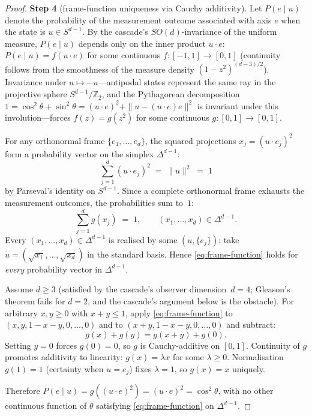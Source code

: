 \documentclass[12pt,a4paper]{article}
\begin{document}
\begin{proof}
\textbf{Step 4} (frame-function uniqueness via Cauchy additivity).
Let $P(e\mid u)$ denote the probability of the measurement outcome
associated with axis $e$ when the state is $u\in S^{d-1}$. By the
cascade's $SO(d)$-invariance of the uniform measure, $P(e\mid u)$
depends only on the inner product $u\cdot e$:
$P(e\mid u) = f(u\cdot e)$ for some continuous $f:[-1,1]\to[0,1]$
(continuity follows from the smoothness of the measure density
$(1-z^2)^{(d-3)/2}$). Invariance under $u\mapsto -u$---antipodal states
represent the same ray in the projective sphere $S^{d-1}/\mathbb{Z}_2$, and
the Pythagorean decomposition~$1 = \cos^2\theta + \sin^2\theta
= (u\cdot e)^2 + \|u-(u\cdot e)e\|^2$ is invariant under this
involution---forces $f(z) = g(z^2)$ for some continuous
$g:[0,1]\to[0,1]$.

For any orthonormal frame $\{e_1,\ldots,e_d\}$, the squared projections
$x_j = (u\cdot e_j)^2$ form a probability vector on the simplex $\Delta^{d-1}$:
\[
\sum_{j=1}^{d}(u\cdot e_j)^2 \;=\; \|u\|^2 \;=\; 1
\]
by Parseval's identity on $S^{d-1}$. Since a complete orthonormal frame
exhausts the measurement outcomes, the probabilities sum to~$1$:
\begin{equation}\label{eq:frame-function}
\sum_{j=1}^{d} g(x_j) \;=\; 1, \qquad (x_1,\ldots,x_d)\in\Delta^{d-1}.
\end{equation}
Every $(x_1,\ldots,x_d)\in\Delta^{d-1}$ is realised by some $(u,\{e_j\})$:
take $u = (\sqrt{x_1},\ldots,\sqrt{x_d})$ in the standard basis. Hence
\eqref{eq:frame-function} holds for \emph{every} probability vector in
$\Delta^{d-1}$.

Assume $d\geq 3$ (satisfied by the cascade's observer dimension~$d=4$;
Gleason's theorem fails for $d=2$, and the cascade's argument below is the
obstacle). For arbitrary $x,y\geq 0$ with $x+y\leq 1$, apply
\eqref{eq:frame-function} to $(x,y,1-x-y,0,\ldots,0)$ and to
$(x+y,1-x-y,0,\ldots,0)$ and subtract:
\[
g(x) + g(y) = g(x+y) + g(0).
\]
Setting $y=0$ forces $g(0) = 0$, so $g$ is Cauchy-additive on $[0,1]$.
Continuity of $g$ promotes additivity to linearity: $g(x) = \lambda x$ for
some $\lambda\geq 0$. Normalisation $g(1) = 1$ (certainty when $u = e_j$)
fixes $\lambda = 1$, so $g(x) = x$ uniquely.

Therefore $P(e\mid u) = g((u\cdot e)^2) = (u\cdot e)^2 = \cos^2\theta$,
with no other continuous function of $\theta$ satisfying
\eqref{eq:frame-function} on $\Delta^{d-1}$.
\end{proof}
\end{document}
